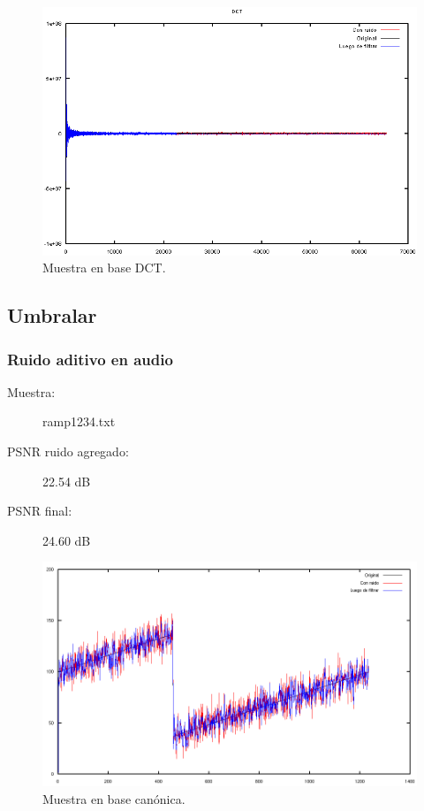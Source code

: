 \documentclass[a4paper,10pt,twoside]{article}
\begin{document}
\begin{figure}[H]
  \centering
  \includegraphics[width=15cm]{graficos/lena_impulsivo_atenuar_dct.png} 
  \caption{Muestra en base DCT.}
\end{figure}




\subsection{Umbralar}

\subsubsection{Ruido aditivo en audio}

\begin{description}
  \item[Muestra:] ramp1234.txt
  \item[PSNR ruido agregado:] 22.54 dB
  \item[PSNR final:] 24.60 dB
\end{description}

\begin{figure}[H]
  \centering
  \includegraphics[width=15cm]{graficos/ramp_aditivo_umbralizar_muestra.png}
  \caption{Muestra en base canónica.}
\end{figure}
\end{document}
